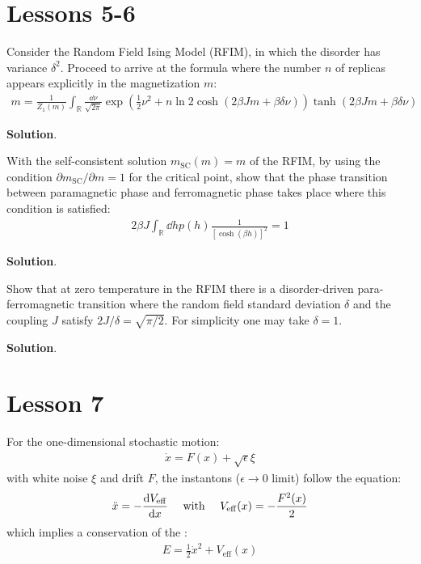 \documentclass[../template.tex]{subfiles}
\begin{document}
\chapter{Lessons 5-6}

\begin{exo}
    Consider the Random Field Ising Model (RFIM), in which the disorder has variance $\delta^2$. Proceed to arrive at the formula where the number $n$ of replicas appears explicitly in the magnetization $m$:
    \begin{align*}
        m = \frac{1}{Z_1(m)} \int_{\mathbb{R}} \frac{\dd{\nu}}{\sqrt{2 \pi}} \exp\left(\frac{1}{2} \nu^2 + n\ln 2 \cosh(2 \beta J m + \beta \delta \nu)  \right)   \tanh(2 \beta Jm + \beta \delta \nu)
    \end{align*}

    \medskip

    \textbf{Solution}. 
\end{exo}

\begin{exo}
    With the self-consistent solution $m_{\mathrm{SC} }(m) = m$ of the RFIM, by using the condition $\partial m_{\mathrm{SC} }/\partial m=1$ for the critical point, show that the phase transition between paramagnetic phase and ferromagnetic phase takes place where this condition is satisfied:
    \begin{align*}
        2 \beta J \int_{\mathbb{R}} \dd{h} p(h) \frac{1}{[\cosh(\beta h)]^2} = 1 
    \end{align*}
    
    \medskip

    \textbf{Solution}. 
\end{exo}

\begin{exo}
    Show that at zero temperature in the RFIM there is a disorder-driven para-ferromagnetic transition where the random field standard deviation $\delta$ and the coupling $J$ satisfy $2J/\delta = \sqrt{\pi/2}$. For simplicity one may take $\delta=1$.

    \medskip

    \textbf{Solution}. 
\end{exo}

\chapter{Lesson 7}
For the one-dimensional stochastic motion:
\begin{align*}
    \dot{x} = F(x) + \sqrt{\epsilon} \xi
\end{align*}
with white noise $\xi$ and drift $F$, the instantons ($\epsilon \to 0$ limit) follow the equation:
\begin{align*}
    \ddot{x} = -\dv{V_{\mathrm{eff} }}{x}\quad \text{ with } \quad V_{\mathrm{eff} }(x) = -\frac{F^2(x)}{2} 
\end{align*}
which implies a conservation of the :
\begin{align*}
    E = \frac{1}{2} \dot{x}^2 + V_{\mathrm{eff} }(x) 
\end{align*}
\end{document}
